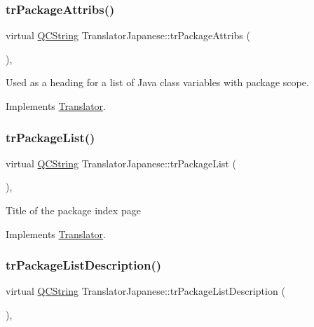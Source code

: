 \subsubsection{\texorpdfstring{trPackageAttribs()}{trPackageAttribs()}}
{\footnotesize\ttfamily virtual \mbox{\hyperlink{class_q_c_string}{Q\+C\+String}} Translator\+Japanese\+::tr\+Package\+Attribs (\begin{DoxyParamCaption}{ }\end{DoxyParamCaption})\hspace{0.3cm}{\ttfamily [inline]}, {\ttfamily [virtual]}}

Used as a heading for a list of Java class variables with package scope. 

Implements \mbox{\hyperlink{class_translator}{Translator}}.

\mbox{\label{class_translator_japanese_ae510018bf6da333f8e7e35459a99c42c}} 
\subsubsection{\texorpdfstring{trPackageList()}{trPackageList()}}
{\footnotesize\ttfamily virtual \mbox{\hyperlink{class_q_c_string}{Q\+C\+String}} Translator\+Japanese\+::tr\+Package\+List (\begin{DoxyParamCaption}{ }\end{DoxyParamCaption})\hspace{0.3cm}{\ttfamily [inline]}, {\ttfamily [virtual]}}

Title of the package index page 

Implements \mbox{\hyperlink{class_translator}{Translator}}.

\mbox{\label{class_translator_japanese_afed2a6851ca809632d284d331ea0c4e3}} 
\subsubsection{\texorpdfstring{trPackageListDescription()}{trPackageListDescription()}}
{\footnotesize\ttfamily virtual \mbox{\hyperlink{class_q_c_string}{Q\+C\+String}} Translator\+Japanese\+::tr\+Package\+List\+Description (\begin{DoxyParamCaption}{ }\end{DoxyParamCaption})\hspace{0.3cm}{\ttfamily [inline]}, {\ttfamily [virtual]}}

